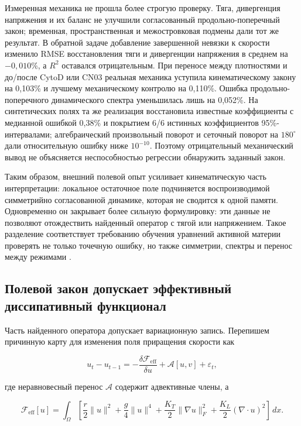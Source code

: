\documentclass[11pt,a4paper]{article}
\begin{document}
Измеренная механика не прошла более строгую проверку. Тяга, дивергенция напряжения и их баланс не улучшили согласованный продольно-поперечный закон; временная, пространственная и межостровковая подмены дали тот же результат. В обратной задаче добавление завершенной невязки к скорости изменило RMSE восстановления тяги и дивергенции напряжения в среднем на $-0,010$\%, а $R^2$ оставался отрицательным. При переносе между плотностями и до/после CytoD или CN03 реальная механика уступила кинематическому закону на 0,103\% и лучшему механическому контролю на 0,110\%. Ошибка продольно-поперечного динамического спектра уменьшилась лишь на 0,052\%. На синтетических полях та же реализация восстановила известные коэффициенты с медианной ошибкой 0,38\% и покрытием 6/6 истинных коэффициентов 95\%-интервалами; алгебраический произвольный поворот и сеточный поворот на $180^\circ$ дали относительную ошибку ниже $10^{-10}$. Поэтому отрицательный механический вывод не объясняется неспособностью регрессии обнаружить заданный закон.

Таким образом, внешний полевой опыт усиливает кинематическую часть интерпретации: локальное остаточное поле подчиняется воспроизводимой симметрийно согласованной динамике, которая не сводится к одной памяти. Одновременно он закрывает более сильную формулировку: эти данные не позволяют отождествить найденный оператор с тягой или напряжением. Такое разделение соответствует требованию обучения уравнений активной материи проверять не только точечную ошибку, но также симметрии, спектры и перенос между режимами \cite{ref32}.

\FloatBarrier
\subsection{Полевой закон допускает эффективный диссипативный функционал}
Часть найденного оператора допускает вариационную запись. Перепишем причинную карту для изменения поля приращения скорости как

\begin{equation}
u_t-u_{t-1}
=
-\frac{\delta\mathcal F_{\mathrm{eff}}}{\delta u}
+\mathcal A[u,v]
+\varepsilon_t ,
\end{equation}

где неравновесный перенос $\mathcal A$ содержит адвективные члены, а

\begin{equation}
\mathcal F_{\mathrm{eff}}[u]
=
\int_\Omega
\left[
\frac{r}{2}\|u\|^2
+\frac{g}{4}\|u\|^4
+\frac{K_T}{2}\|\nabla u\|_F^2
+\frac{K_L}{2}(\nabla\!\cdot u)^2
\right]\,dx .
\label{eq:effective_functional}
\end{equation}
\end{document}
